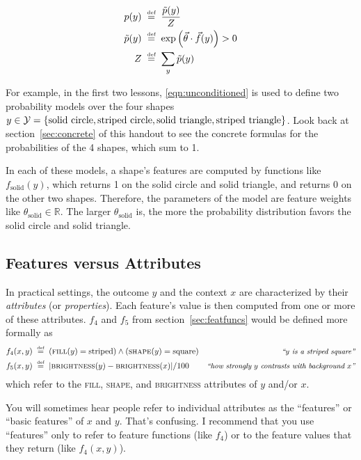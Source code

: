 \documentclass[11pt]{article}
\newcommand{\defeq}{\;\stackrel{\mbox{\tiny def}}{=}\;}
\newcommand{\vtheta}{\vec{\theta}}
\newcommand{\ptilde}{\tilde{p}}
\newcommand{\Real}{{\mathbb R}}
\begin{document}
\vspace{-16pt}
\begin{align}
  p(y) &\defeq \frac{\ptilde(y)}{Z} \label{eqn:unconditioned} \\
  \ptilde(y) &\defeq \exp \left(\vtheta \cdot \vec{f}(y)\right) > 0 \\
  Z &\defeq \sum_y \ptilde(y)
\end{align}
\vspace{-12pt}

For example, in the first two lessons, \eqref{eqn:unconditioned} is
used to define two probability models over the four shapes
$y \in {\cal Y} = \{\text{solid circle}, \text{striped circle},
\text{solid triangle}, \text{striped triangle}\}$.
Look back at section~\ref{sec:concrete} of this
handout to see the concrete formulas for the probabilities of the 4
shapes, which sum to 1.

\medskip
In each of these models, a shape's features are computed by
functions like $f_{\textrm{solid}}(y)$, which returns 1 on the solid
circle and solid triangle, and returns 0 on the other two shapes.
Therefore, the parameters of the model are feature weights like
$\theta_{\textrm{solid}} \in \Real$.  The larger $\theta_{\textrm{solid}}$ is,
the more the probability distribution favors the solid circle and
solid triangle.

\subsection{Features versus Attributes}

In practical settings, the outcome $y$ and the context $x$ are
characterized by their {\em attributes} (or {\em properties}).  Each
feature's value is then computed from one or more of these attributes.
$f_4$ and $f_5$ from section~\ref{sec:featfuncs} would be defined more
formally as
\begin{align}
f_4(x,y) & \defeq (\textsc{fill}(y)=\text{striped}) \wedge (\textsc{shape}(y)=\text{square})
             & \text{\small\it ``$y$ is a striped square''} \\
f_5(x,y) & \defeq |\textsc{brightness}(y)-\textsc{brightness}(x)|/100
             & \text{\small\it ``how strongly $y$ contrasts with background $x$''}
\end{align}
which refer to the \textsc{fill}, \textsc{shape}, and \textsc{brightness} attributes
of $y$ and/or $x$.

\medskip
You will sometimes hear people refer to individual attributes as the
``features'' or ``basic features'' of $x$ and $y$.  That's confusing.
I recommend that you use ``features'' only to refer to feature
functions (like $f_4$) or to the feature values that they return (like $f_4(x,y)$).
\end{document}
